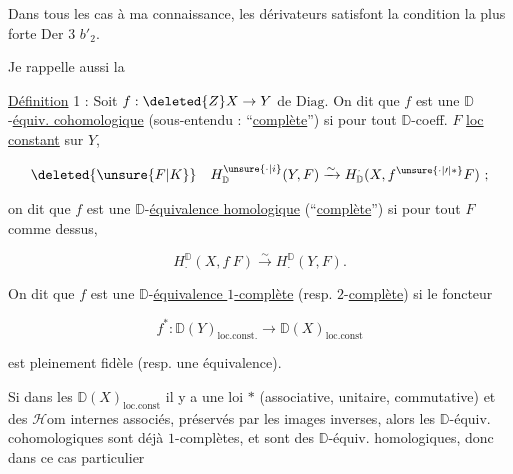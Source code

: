 Dans tous les cas à ma connaissance, les dérivateurs satisfont la condition la plus forte Der 3 $b'_2$.



Je rappelle aussi la

\uline{Définition} 1 : Soit $f:\deleted{Z}X\to Y$ de $\mathrm{Diag}$. On dit que $f$ est une $\mathbb D$-\uline{équiv. cohomologique} (sous-entendu : ``\uline{complète}'') si pour tout $\mathbb D$-coeff. $F$ \uline{loc constant} sur $Y$,

\[
\deleted{\unsure{F|K}}\quad H^{\unsure{\cdot|i}}_{\mathbb D}(Y,F)\xrightarrow{\sim}H^{\cdot}_{\mathbb D}(X,f^{\unsure{\cdot|{\prime}|*}}F)\ ;
\]

on dit que $f$ est une $\mathbb D$-\uline{équivalence homologique} (``\uline{complète}'') si pour tout $F$ comme dessus,

\[
H_{\cdot}^{\mathbb D}(X,f^{\cdot}F)\xrightarrow{\sim}H_{\cdot}^{\mathbb D}(Y,F).
\]

On dit que $f$ est une $\mathbb D$-\uline{équivalence $1$-complète} (resp. $2$-\uline{complète}) si  le foncteur

\[
f^*:\mathbb D(Y)_{\mathrm{loc.const.}}\longrightarrow\mathbb D(X)_{\mathrm{loc.const}}
\]

est pleinement fidèle (resp. une équivalence).


Si dans les  $\mathbb D(X)_{\mathrm{loc.const}}$ il y a une loi $*$ (associative, unitaire, commutative) et des $\mathcal H\mathrm{om}$ internes associés, préservés par les images inverses, alors les $\mathbb D$-équiv.  cohomologiques sont déjà $1$-complètes, et sont  des $\mathbb D$-équiv. homologiques, donc dans ce cas particulier


